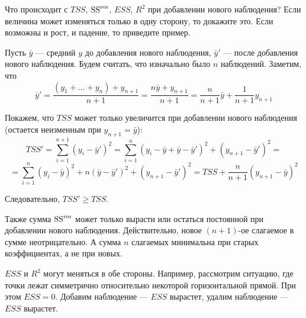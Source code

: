 \begin{problem}
Что происходит с $TSS$, $\mathrm{SS}^{\text{res}}$, $ESS$, $R^2$ при добавлении нового наблюдения? Если величина может изменяться только в одну сторону, то докажите это. Если возможны и рост, и падение, то приведите пример.


\begin{sol}
Пусть \(\bar{y}\) — средний \(y\) до добавления нового наблюдения, \(\bar{y}'\) — после добавления нового наблюдения. Будем считать, что изначально было \(n\) наблюдений. Заметим, что
\[\bar{y}' = \frac{(y_1 + \ldots + y_n) + y_{n+1}}{n + 1} = \frac{n \bar{y} + y_{n + 1}}{n + 1} = \frac{n}{n+ 1}\bar{y} + \frac{1}{n+1}y_{n+1}\]

Покажем, что \(TSS\) может только увеличится при добавлении нового наблюдения (остается неизменным при \(y_{n+1} = \bar{y}\)):
\[TSS'= \sum_{i = 1}^{n + 1} (y_i - \bar{y}')^2 = \sum_{i = 1}^{n} (y_i - \bar{y} + \bar{y} - \bar{y}')^2 + (y_{n + 1} - \bar{y}')^2 = \]
\[=\sum_{i = 1}^{n} (y_i - \bar{y})^2 + n(\bar{y} - \bar{y}')^2 + (y_{n + 1} - \bar{y}')^2  = TSS + \frac{n}{n+1} (y_{n+1} - \bar{y})^2\]

Следовательно, \(TSS' \geq TSS\).

Также сумма \(\mathrm{SS}^{\text{res}}\) может только вырасти или остаться постоянной при добавлении нового наблюдения. Действительно, новое $(n+1)$-ое слагаемое в сумме неотрицательно. А сумма $n$ слагаемых минимальна при старых коэффициентах, а не при новых.

\(ESS\) и \(R^2\) могут меняться в обе стороны. Например, рассмотрим ситуацию, где точки лежат симметрично относительно некоторой горизонтальной прямой. При этом $ESS=0$. Добавим наблюдение — $ESS$ вырастет, удалим наблюдение — $ESS$ вырастет.
\end{sol}
\end{problem}



